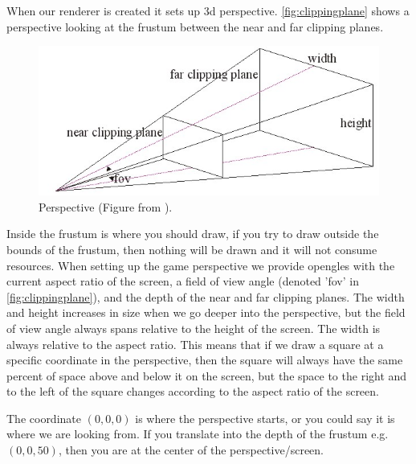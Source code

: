 When our renderer is created it sets up \ac{3d} perspective. \autoref{fig:clippingplane} shows a perspective looking at the frustum between the near and far clipping planes.
\begin{figure}[H]
\centering
\includegraphics[width=0.9\linewidth]{img/clippingplane.jpg}
\caption{Perspective (Figure from \citep{clippingplane}).}
\label{fig:clippingplane}
\end{figure}
Inside the frustum is where you should draw, if you try to draw outside the bounds of the frustum, then nothing will be drawn and it will not consume resources. When setting up the game perspective we provide \ac{opengles} with the current aspect ratio of the screen, a field of view angle (denoted 'fov' in \autoref{fig:clippingplane}), and the depth of the near and far clipping planes. The width and height increases in size when we go deeper into the perspective, but the field of view angle always spans relative to the height of the screen. The width is always relative to the aspect ratio. This means that if we draw a square at a specific coordinate in the perspective, then the square will always have the same percent of space above and below it on the screen, but the space to the right and to the left of the square changes according to the aspect ratio of the screen.

The coordinate $(0, 0, 0)$ is where the perspective starts, or you could say it is where we are looking from. If you translate into the depth of the frustum e.g. \linebreak $(0, 0, 50)$, then you are at the center of the perspective/screen.


